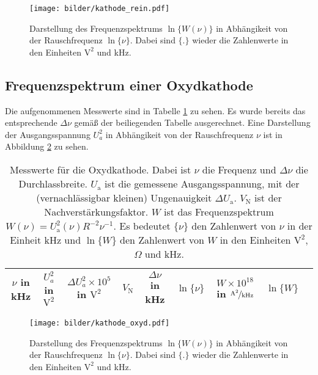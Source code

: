 	\begin{figure}
		\centering
		\texttt{[image: bilder/kathode\_rein.pdf]}
		\caption{Darstellung des Frequenzspektrums $\ln\{W(\nu)\}$ in
		Abhängikeit von der Rauschfrequenz $\ln\{\nu\}$. Dabei sind $\{ . \}$ wieder
		die Zahlenwerte in den Einheiten $\text{V}^2$ und kHz.}
		\label{fig:kathode_rein}
	\end{figure}

\clearpage



\subsection{Frequenzspektrum einer Oxydkathode}

	Die aufgenommenen Messwerte sind in Tabelle
	\ref{tab:kathode_oxyd} zu sehen. Es wurde bereits das
	entsprechende $\Delta \nu$ gemäß der beiliegenden Tabelle
	ausgerechnet. Eine Darstellung der Ausgangsspannung $U_a^2$ in
	Abhängikeit von der Rauschfrequenz $\nu$ ist in Abbildung
	\ref{fig:kathode_oxyd} zu sehen.
	\begin{table}
		\centering
		\begin{tabular}{ccccccccc}
		\toprule \midrule
		$\nu$ in kHz	 & $U_a^2$ in $\text{V}^2$	& $\Delta U_a^2 \times 10^5$ in $\text{V}^2$ &
		$V_\text{N}$	 & $\Delta \nu$ in kHz 		& $\ln \{\nu\}$				     &
		$W\times 10^{18}$ in $\nicefrac{\text{A}^2}{\text{kHz}}$&$\ln \{W\}$	  \\
		\midrule
		
		\midrule
		\bottomrule
		\end{tabular}
		\caption{Messwerte für
		die Oxydkathode. Dabei ist $\nu$ die Frequenz und $\Delta \nu$ die
		Durchlassbreite. $U_\text{a}$ ist die gemessene Ausgangsspannung, mit der
		(vernachlässigbar kleinen) Ungenauigkeit $\Delta U_\text{a}$. $V_\text{N}$
		ist der Nachverstärkungsfaktor. $W$ ist das Frequenzspektrum
		$W(\nu)=U_\text{a}^2(\nu) R^{-2} \nu^{-1}$. Es bedeutet $\{\nu \}$ den
		Zahlenwert von $\nu$ in der Einheit kHz und $\ln\{W\}$ den Zahlenwert
		von $W$ in den Einheiten $\text{V}^2$, $\Omega$ und kHz.}
		\label{tab:kathode_oxyd}
	\end{table}

	\begin{figure}
		\centering
		\texttt{[image: bilder/kathode\_oxyd.pdf]}
		\caption{Darstellung des Frequenzspektrums $\ln\{W(\nu)\}$ in
		Abhängikeit von der Rauschfrequenz $\ln\{\nu\}$. Dabei sind $\{ . \}$ wieder
		die Zahlenwerte in den Einheiten $\text{V}^2$ und kHz.}
		\label{fig:kathode_oxyd}
	\end{figure}

